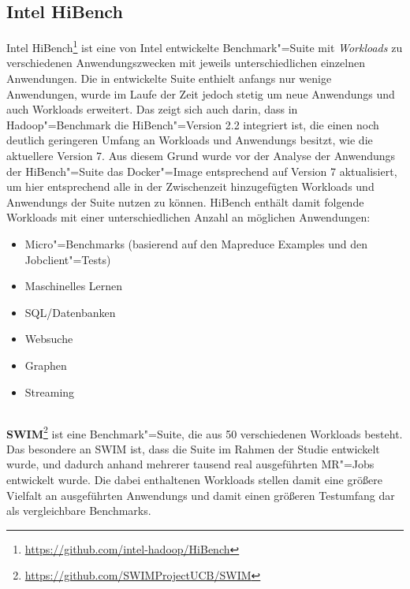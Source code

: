 \subsection{Intel HiBench}
\label{subsec:hibench}

Intel HiBench\footnote{\url{https://github.com/intel-hadoop/HiBench}} ist eine von Intel entwickelte Benchmark"=Suite mit \emph{Workloads} zu verschiedenen Anwendungszwecken mit jeweils unterschiedlichen einzelnen Anwendungen.
Die in \cite{Huang2010} entwickelte Suite enthielt anfangs nur wenige Anwendungen, wurde im Laufe der Zeit jedoch stetig um neue \glspl{Anwendung} und auch Workloads erweitert.
Das zeigt sich auch darin, dass in Hadoop"=Benchmark die HiBench"=Version \mbox{2.2} integriert ist, die einen noch deutlich geringeren Umfang an Workloads und \glspl{Anwendung} besitzt, wie \zB die aktuellere Version 7.
Aus diesem Grund wurde vor der Analyse der \glspl{Anwendung} der HiBench"=Suite das Docker"=Image entsprechend auf Version 7 aktualisiert, um hier entsprechend alle in der Zwischenzeit hinzugefügten Workloads und \glspl{Anwendung} der Suite nutzen zu können.
HiBench enthält damit folgende Workloads mit einer unterschiedlichen Anzahl an möglichen Anwendungen:

\begin{itemize}
    \item Micro"=Benchmarks (basierend auf den Mapreduce Examples und den Jobclient"=Tests)
    \item Maschinelles Lernen
    \item SQL/Datenbanken
    \item Websuche
    \item Graphen
    \item Streaming
\end{itemize}

\subsection{}
\label{subsec:swim}

\textbf{\gls{SWIM}}\footnote{\url{https://github.com/SWIMProjectUCB/SWIM}} ist eine Benchmark"=Suite, die aus 50 verschiedenen Workloads besteht.
Das besondere an \gls{SWIM} ist, dass die Suite im Rahmen der Studie \cite{Chen2012} entwickelt wurde, und dadurch anhand mehrerer tausend real ausgeführten \gls{MR}"=Jobs entwickelt wurde.
Die dabei enthaltenen Workloads stellen damit eine größere Vielfalt an ausgeführten \glspl{Anwendung} und damit einen größeren Testumfang dar als vergleichbare Benchmarks\cite{SwimWikiHome}.

